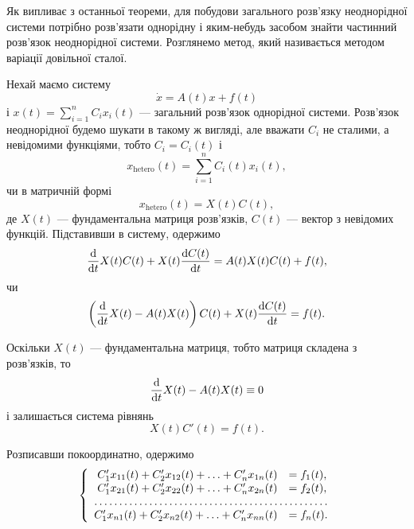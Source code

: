 Як випливає з останньої теореми, для побудови загального розв'язку неоднорідної системи потрібно розв'язати однорідну і яким-небудь засобом знайти частинний розв'язок неоднорідної системи. Розглянемо метод, який називається методом варіації довільної сталої. \parvskip

Нехай маємо систему
\begin{equation*}
 	\dot x = A(t) x + f(t)
\end{equation*}
і $x(t) = \sum_{i = 1}^n C_i x_i(t)$ --- загальний розв'язок однорідної системи. Розв'язок неоднорідної будемо шукати в такому ж вигляді, але вважати $C_i$ не сталими, а невідомими функціями, тобто $C_i = C_i(t)$ і 
\begin{equation*}
	x_{\text{hetero}}(t) = \sum_{i = 1}^n C_i(t) x_i(t),
\end{equation*}
чи в матричній формі
\begin{equation*}
	x_{\text{hetero}}(t) = X(t) C(t),
\end{equation*}
де $X(t)$ --- фундаментальна матриця розв'язків, $C(t)$ --- вектор з невідомих функцій. Підставивши в систему, одержимо
\begin{equation*}
	\frac{\mathop{}\!\mathrm{d}}{\mathop{}\!\mathrm{d} t} X(t) C(t) + X(t) \frac{\mathop{}\!\mathrm{d} C(t)}{\mathop{}\!\mathrm{d} t} = A(t) X(t) C(t) + f(t),
\end{equation*}
чи
\begin{equation*}
	\left( \frac{\mathop{}\!\mathrm{d}}{\mathop{}\!\mathrm{d} t} X(t) - A(t) X(t) \right) C(t) + X(t) \frac{\mathop{}\!\mathrm{d} C(t)}{\mathop{}\!\mathrm{d} t} = f(t).
\end{equation*}

Оскільки $X(t)$ --- фундаментальна матриця, тобто матриця складена з розв'язків, то
\begin{equation*}
	\frac{\mathop{}\!\mathrm{d}}{\mathop{}\!\mathrm{d} t} X(t) - A(t) X(t) \equiv 0
\end{equation*}
і залишається система рівнянь
\begin{equation*}
	X(t) C'(t) = f(t).
\end{equation*}

Розписавши покоординатно, одержимо
\begin{equation*}
	\left\{
		\begin{array}{rl}
			C_1' x_{11}(t) + C_2' x_{12}(t) + \ldots + C_n' x_{1n}(t) &= f_1(t), \\
			C_1' x_{21}(t) + C_2' x_{22}(t) + \ldots + C_n' x_{2n}(t) &= f_2(t), \\
			\hdotsfor{2} \\
			C_1' x_{n1}(t) + C_2' x_{n2}(t) + \ldots + C_n' x_{nn}(t) &= f_n(t).
		\end{array}
	\right.
\end{equation*}

